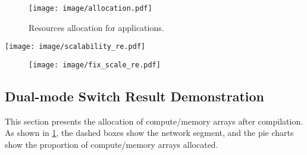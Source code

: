 
\begin{figure}[t]
    \centering
    \texttt{[image: image/allocation.pdf]}
    \caption{Resources allocation for applications.}
    \label{fig:allocation}
\end{figure}
\begin{figure*}[t]
    \centering
    \texttt{[image: image/scalability\_re.pdf]}
   \caption{}
    \label{fig:scale}
\end{figure*}


\begin{figure}[t]
    \centering
    \texttt{[image: image/fix\_scale\_re.pdf]}
    \caption{}
    \label{fig:scale_vis}
\end{figure}


\subsection{Dual-mode Switch Result Demonstration}
This section presents the allocation of compute/memory arrays after compilation.
As shown in \fig \ref{fig:allocation}, the dashed boxes show the network segment, and the pie charts show the proportion of compute/memory arrays allocated.

